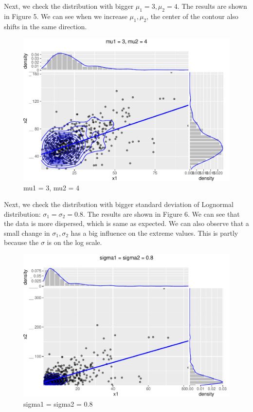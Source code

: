 \documentclass[11pt,]{article}
\begin{document}
Next, we check the distribution with bigger \(\mu_1=3, \mu_2=4\). The
results are shown in Figure 5. We can see when we increase
\(\mu_1,\mu_2\), the center of the contour also shifts in the same
direction.

\begin{figure}
\centering
\includegraphics{figs/unnamed-chunk-9.pdf}
\caption{mu1 = 3, mu2 = 4}
\end{figure}

Next, we check the distribution with bigger standard deviation of
Lognormal distribution: \(\sigma_1 =\sigma_2 = 0.8\). The results are
shown in Figure 6. We can see that the data is more dispersed, which is
same as expected. We can also observe that a small change in
\(\sigma_1, \sigma_2\) has a big influence on the extreme values. This
is partly because the \(\sigma\) is on the log scale.

\begin{figure}
\centering
\includegraphics{figs/unnamed-chunk-10.pdf}
\caption{sigma1 = sigma2 = 0.8}
\end{figure}
\end{document}
